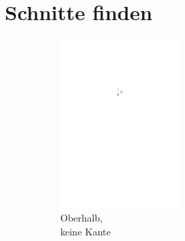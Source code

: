 \documentclass[a4paper]{scrreprt}
\theoremstyle{definition}
\begin{document}
\section{Schnitte finden}

\begin{figure}[h]
        \centering
        \begin{subfigure}[b]{0.2\textwidth}
                \includegraphics[width=0.5\textwidth]{schnitt_finden_top_none}
                \caption{Oberhalb,\\ keine Kante}
                \label{fig:cutfinding_top_none}
        \end{subfigure}%
        \quad
        \begin{subfigure}[b]{0.2\textwidth}

\end{subfigure}
\end{figure}
\end{document}
